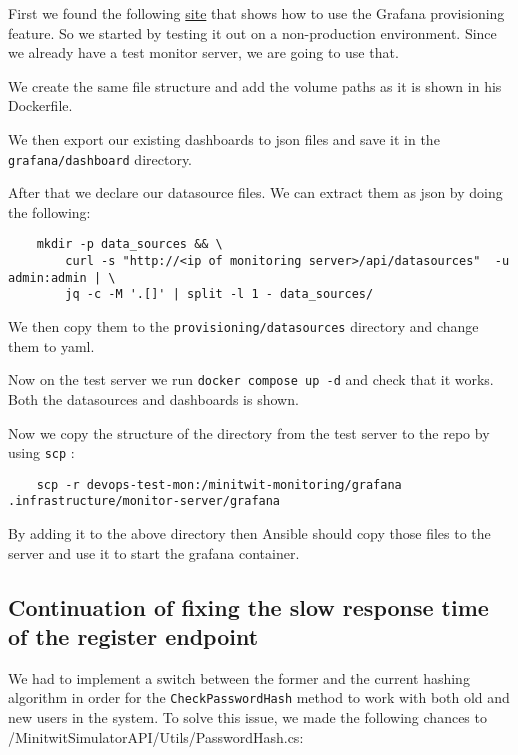 First we found the following \href{https://github.com/SebastianTorralba/Self-Provisioned-Grafana}{site} that shows how to use the Grafana provisioning feature. So we started by testing it out on a non-production environment. Since we already have a test monitor server, we are going to use that.

We create the same file structure and add the volume paths as it is shown in his Dockerfile.

We then export our existing dashboards to json files and save it in the \texttt{grafana/dashboard} directory.

After that we declare our datasource files. We can extract them as json by doing the following:

\begin{verbatim}
    mkdir -p data_sources && \
        curl -s "http://<ip of monitoring server>/api/datasources"  -u admin:admin | \
        jq -c -M '.[]' | split -l 1 - data_sources/
\end{verbatim}

We then copy them to the \texttt{provisioning/datasources} directory and change them to yaml.

Now on the test server we run \texttt{docker\ compose\ up\ -d} and check that it works. Both the datasources and dashboards is shown.

Now we copy the structure of the directory from the test server to the repo by using \texttt{scp} :

\begin{verbatim}
    scp -r devops-test-mon:/minitwit-monitoring/grafana .infrastructure/monitor-server/grafana
\end{verbatim}

By adding it to the above directory then Ansible should copy those files to the server and use it to start the grafana container.

\subsection{Continuation of fixing the slow response time of the register endpoint}
\label{log:continuation-of-fixing-the-slow-response-time-of-the-register-endpoint}

We had to implement a switch between the former and the current hashing algorithm in order for the \texttt{CheckPasswordHash} method to work with both old and new users in the system. To solve this issue, we made the following chances to /MinitwitSimulatorAPI/Utils/PasswordHash.cs:

